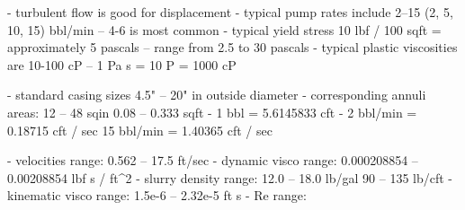 - turbulent flow is good for displacement
- typical pump rates include 2--15 (2, 5, 10, 15) bbl/min
-- 4-6 is most common
- typical yield stress 10 lbf / 100 sqft = approximately 5 pascals
-- range from 2.5 to 30 pascals
- typical plastic viscosities are 10-100 cP
-- 1 Pa s = 10 P = 1000 cP

- standard casing sizes 4.5" -- 20" in outside diameter
- corresponding annuli areas: 12 -- 48 sqin 
                              0.08 -- 0.333 sqft
- 1 bbl = 5.6145833 cft
- 2 bbl/min   = 0.18715 cft / sec
  15 bbl/min  = 1.40365 cft / sec

- velocities range: 0.562 -- 17.5 ft/sec
- dynamic visco range: 0.000208854 -- 0.00208854 lbf s / ft^2
- slurry density range: 12.0 -- 18.0 lb/gal
                        90   -- 135 lb/cft
- kinematic visco range: 1.5e-6 -- 2.32e-5 ft s
- Re range: 
